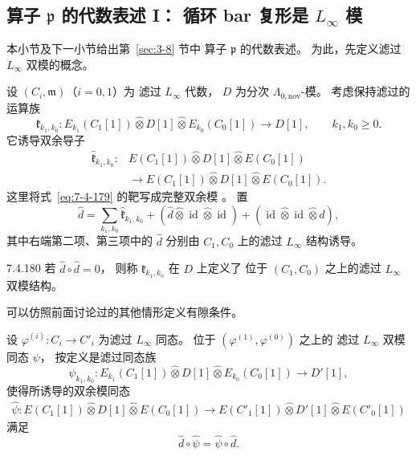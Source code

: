 
\subsection{算子 $\mathfrak p$ 的代数表述 I：
循环 bar 复形是 $L_\infty$ 模}
\label{subsec:7-4-10}

本小节及下一小节给出第~\ref{sec:3-8} 节中
算子 $\mathfrak p$ 的代数表述。
为此，先定义滤过 $L_\infty$ 双模的概念。

设 $(C_i,\mathfrak m)$（$i=0,1$）为
滤过 $L_\infty$ 代数，
$D$ 为分次 $\Lambda_{0,\mathrm{nov}}$-模。
考虑保持滤过的运算族
\begin{equation}
\mathfrak k_{k_1,k_0}\colon
E_{k_1}(C_1[1])\widehat\otimes D[1]
\widehat\otimes E_{k_0}(C_0[1])
\longrightarrow D[1],
\qquad k_1,k_0\geq0.
\tag{7.4.178}\label{eq:7-4-178}
\end{equation}
它诱导双余导子
\begin{equation}
\begin{aligned}
\widehat{\mathfrak k}_{k_1,k_0}\colon
&E(C_1[1])\widehat\otimes D[1]
\widehat\otimes E(C_0[1])\\
&\longrightarrow
E(C_1[1])\widehat\otimes D[1]
\widehat\otimes E(C_0[1]).
\end{aligned}
\tag{7.4.179}\label{eq:7-4-179}
\end{equation}
这里将式~\eqref{eq:7-4-179} 的靶写成完整双余模
。
置
\[
\widehat d
=
\sum_{k_1,k_0}\widehat{\mathfrak k}_{k_1,k_0}
+(\widehat d\widehat\otimes\operatorname{id}
\widehat\otimes\operatorname{id})
+(\operatorname{id}\widehat\otimes\operatorname{id}
\widehat\otimes\widehat d),
\]
其中右端第二项、第三项中的 $\widehat d$
分别由 $C_1,C_0$ 上的滤过 $L_\infty$ 结构诱导。

\begin{definition}{7.4.180}\label{def:7-4-180}
若 $\widehat d\circ\widehat d=0$，
则称 $\mathfrak k_{k_1,k_0}$ 在 $D$ 上定义了
位于 $(C_1,C_0)$ 之上的滤过 $L_\infty$ 双模结构。
\end{definition}

可以仿照前面讨论过的其他情形定义有隙条件。

设
$\varphi^{(i)}\colon C_i\to C'_i$
为滤过 $L_\infty$ 同态。
位于 $(\varphi^{(1)},\varphi^{(0)})$ 之上的
滤过 $L_\infty$ 双模同态 $\psi$，
按定义是滤过同态族
\begin{equation}
\psi_{k_1,k_0}\colon
E_{k_1}(C_1[1])\widehat\otimes D[1]
\widehat\otimes E_{k_0}(C_0[1])
\longrightarrow D'[1],
\tag{7.4.181}\label{eq:7-4-181}
\end{equation}
使得所诱导的双余模同态
\[
\begin{aligned}
\widehat\psi\colon
E(C_1[1])\widehat\otimes D[1]
\widehat\otimes E(C_0[1])
\longrightarrow
E(C'_1[1])\widehat\otimes D'[1]
\widehat\otimes E(C'_0[1])
\end{aligned}
\]
满足
\[
\widehat d\circ\widehat\psi
=\widehat\psi\circ\widehat d.
\]

